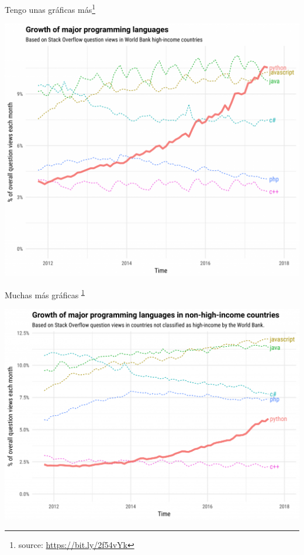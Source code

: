 \documentclass[bigger,unknownkeysallowed]{beamer}
\begin{document}
\begin{frame}[label={sec:org35a2060}]{Tengo unas gráficas más\footnote{source: \url{https://bit.ly/2f54vYk}\label{org464d895}}}
\begin{center}
\includegraphics[height=.7\textheight]{growth.png}
\end{center}
\end{frame}

\begin{frame}[label={sec:org25c6815}]{Muchas más gráficas \textsuperscript{\ref{org464d895}}}
\begin{center}
\includegraphics[height=.8\textheight]{non_hight.png}
\end{center}
\end{frame}
\end{document}
